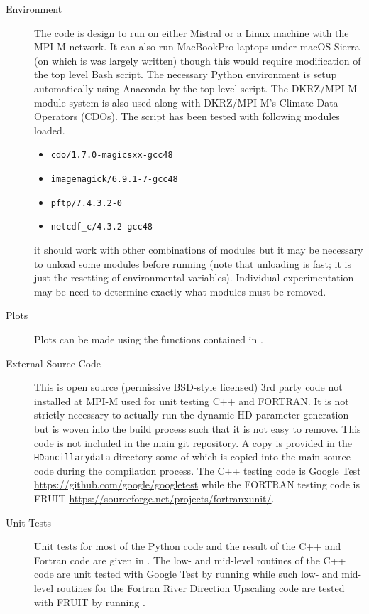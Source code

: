 \documentclass{article}
\begin{document}
\begin{description}
\item[Environment] The code is design to run on either Mistral or a Linux machine with the MPI-M network. It can also run MacBookPro laptops under macOS Sierra (on which is was largely written) though this would require modification of the top level Bash script. The necessary Python environment is setup automatically using Anaconda by the top level script. The DKRZ/MPI-M module system is also used along with DKRZ/MPI-M's Climate Data Operators (CDOs). The script has been tested with following modules loaded.
\begin{itemize}
\item \lstinline[style=bash_input]{cdo/1.7.0-magicsxx-gcc48}
\item \lstinline[style=bash_input]{imagemagick/6.9.1-7-gcc48}
\item \lstinline[style=bash_input]{pftp/7.4.3.2-0}
\item \lstinline[style=bash_input]{netcdf_c/4.3.2-gcc48}
\end{itemize}
it should work with other combinations of modules but it may be necessary to unload some modules before running (note that unloading is fast; it is just the resetting of environmental variables). Individual experimentation may be need to determine exactly what modules must be removed.
\item[Plots] Plots can be made using the functions contained in .
\item[External Source Code] This is open source (permissive BSD-style licensed) 3rd party code not installed at MPI-M used for unit testing C++ and FORTRAN.  It is not strictly necessary to actually run the dynamic HD parameter generation but is woven into the build process such that it is not easy to remove. This code is not included in the main git repository. A copy is provided in the \texttt{HDancillarydata} directory some of which is copied into the main source code during the compilation process. The C++ testing code is Google Test \url{https://github.com/google/googletest} while the FORTRAN testing code is FRUIT \url{https://sourceforge.net/projects/fortranxunit/}.
\item[Unit Tests] Unit tests for most of the Python code and the result of the C++ and Fortran code are given in . The low- and mid-level routines of the C++ code are unit tested with Google Test by running  while such low- and mid-level routines for the Fortran River Direction Upscaling code are tested with FRUIT by running .

\end{description}
\end{document}
